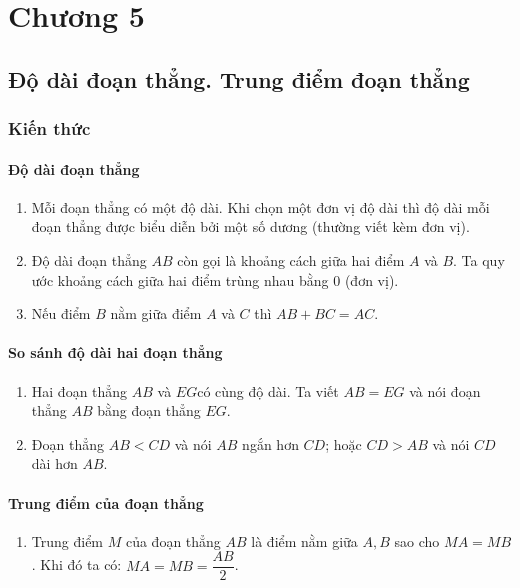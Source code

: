 \def\i{\item}
\graphicspath{{../pictures/vande29/}}
\chapter{Chương 5}
\section{Độ dài đoạn thẳng. Trung điểm đoạn thẳng}
\subsection{Kiến thức} 
\subsubsection{Độ dài đoạn thẳng} 
\begin{enumerate}[--, leftmargin=*]
	\i Mỗi đoạn thẳng có một độ dài. Khi chọn một đơn vị độ dài thì độ dài mỗi đoạn thẳng được biểu diễn bởi một số dương (thường viết kèm đơn vị).
	\i Độ dài đoạn thẳng $AB$ còn gọi là khoảng cách giữa hai điểm $A$ và $B$. Ta quy ước khoảng cách giữa hai điểm trùng nhau bằng 0 (đơn vị).
	\i Nếu điểm $B$ nằm giữa điểm $A$ và $C$ thì $AB+BC=AC$.
	\begin{center}
	\end{center}
\end{enumerate}
\subsubsection{So sánh độ dài hai đoạn thẳng}
\begin{enumerate}[--, leftmargin=*]
	\i Hai đoạn thẳng $AB$ và $EG$có cùng độ dài. Ta viết $AB=EG$ và nói đoạn thẳng $AB$ bằng đoạn thẳng $EG$.
	\i Đoạn thẳng $AB<CD$ và nói $AB$ ngắn hơn $CD$; hoặc $CD>AB$ và nói $CD$ dài hơn $AB$.
\end{enumerate}
\subsubsection{Trung điểm của đoạn thẳng}
\begin{enumerate}[--, leftmargin=*]
	\i Trung điểm $M$ của đoạn thẳng $AB$ là điểm nằm giữa $A,B$ sao cho $MA=MB$. Khi đó ta có: $MA=MB=\dfrac{AB}{2}$.
\end{enumerate}
